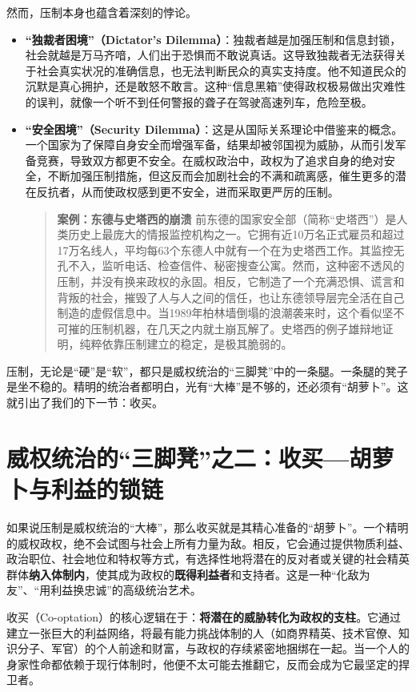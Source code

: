 然而，压制本身也蕴含着深刻的悖论。
\begin{itemize}
    \item \textbf{“独裁者困境”（Dictator's Dilemma）}：独裁者越是加强压制和信息封锁，社会就越是万马齐喑，人们出于恐惧而不敢说真话。这导致独裁者无法获得关于社会真实状况的准确信息，也无法判断民众的真实支持度。他不知道民众的沉默是真心拥护，还是敢怒不敢言。这种“信息黑箱”使得政权极易做出灾难性的误判，就像一个听不到任何警报的聋子在驾驶高速列车，危险至极。
    \item \textbf{“安全困境”（Security Dilemma）}：这是从国际关系理论中借鉴来的概念。一个国家为了保障自身安全而增强军备，结果却被邻国视为威胁，从而引发军备竞赛，导致双方都更不安全。在威权政治中，政权为了追求自身的绝对安全，不断加强压制措施，但这反而会加剧社会的不满和疏离感，催生更多的潜在反抗者，从而使政权感到更不安全，进而采取更严厉的压制。
    \begin{quote}
    \textbf{案例：东德与史塔西的崩溃}
    前东德的国家安全部（简称“史塔西”）是人类历史上最庞大的情报监控机构之一。它拥有近10万名正式雇员和超过17万名线人，平均每63个东德人中就有一个在为史塔西工作。其监控无孔不入，监听电话、检查信件、秘密搜查公寓。然而，这种密不透风的压制，并没有换来政权的永固。相反，它制造了一个充满恐惧、谎言和背叛的社会，摧毁了人与人之间的信任，也让东德领导层完全活在自己制造的虚假信息中。当1989年柏林墙倒塌的浪潮袭来时，这个看似坚不可摧的压制机器，在几天之内就土崩瓦解了。史塔西的例子雄辩地证明，纯粹依靠压制建立的稳定，是极其脆弱的。
    \end{quote}
\end{itemize}

压制，无论是“硬”是“软”，都只是威权统治的“三脚凳”中的一条腿。一条腿的凳子是坐不稳的。精明的统治者都明白，光有“大棒”是不够的，还必须有“胡萝卜”。这就引出了我们的下一节：收买。

\section{威权统治的“三脚凳”之二：收买---胡萝卜与利益的锁链}

如果说压制是威权统治的“大棒”，那么收买就是其精心准备的“胡萝卜”。一个精明的威权政权，绝不会试图与社会上所有力量为敌。相反，它会通过提供物质利益、政治职位、社会地位和特权等方式，有选择性地将潜在的反对者或关键的社会精英群体\textbf{纳入体制内}，使其成为政权的\textbf{既得利益者}和支持者。这是一种“化敌为友”、“用利益换忠诚”的高级统治艺术。

收买（Co-optation）的核心逻辑在于：\textbf{将潜在的威胁转化为政权的支柱}。它通过建立一张巨大的利益网络，将最有能力挑战体制的人（如商界精英、技术官僚、知识分子、军官）的个人前途和财富，与政权的存续紧密地捆绑在一起。当一个人的身家性命都依赖于现行体制时，他便不太可能去推翻它，反而会成为它最坚定的捍卫者。

